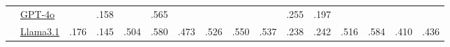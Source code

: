 \begin{table}[!t]
\begin{tabularx}{\textwidth}{llZZZZZZZZZZZZZZ}
        \midrule
                            & \hphantom{ }\underline{GPT-4o}             &                       & .158                    &                           & .565                      &                       &                      &                &                & .255               & .197               &                &  & 
& 
\\
        & \hphantom{ }\underline{Llama3.1}           & .176                      & .145
        & .504               & .580
        & .473               & .526
        & .550               & .537
        & .238               & .242
        & .516               & .584  & .410
& .436
                                                                                                                                                                                                                                                                                 \\






        \bottomrule
    \end{tabularx}

\end{table}


